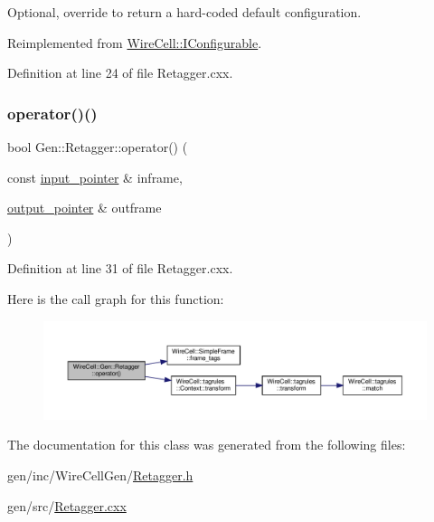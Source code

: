 Optional, override to return a hard-\/coded default configuration. 



Reimplemented from \hyperlink{class_wire_cell_1_1_i_configurable_a54841b2da3d1ea02189478bff96f7998}{Wire\+Cell\+::\+I\+Configurable}.



Definition at line 24 of file Retagger.\+cxx.

\mbox{\label{class_wire_cell_1_1_gen_1_1_retagger_a4bbeda9e4329bfa262e8248f5a876267}} 
\subsubsection{\texorpdfstring{operator()()}{operator()()}}
{\footnotesize\ttfamily bool Gen\+::\+Retagger\+::operator() (\begin{DoxyParamCaption}\item[{const \hyperlink{class_wire_cell_1_1_i_function_node_a55c0946156df9b712b8ad1a0b59b2db6}{input\+\_\+pointer} \&}]{inframe,  }\item[{\hyperlink{class_wire_cell_1_1_i_function_node_afc02f1ec60d31aacddf64963f9ca650b}{output\+\_\+pointer} \&}]{outframe }\end{DoxyParamCaption})\hspace{0.3cm}{\ttfamily [virtual]}}



Definition at line 31 of file Retagger.\+cxx.

Here is the call graph for this function\+:
\nopagebreak
\begin{figure}[H]
\begin{center}
\leavevmode
\includegraphics[width=350pt]{class_wire_cell_1_1_gen_1_1_retagger_a4bbeda9e4329bfa262e8248f5a876267_cgraph}
\end{center}
\end{figure}


The documentation for this class was generated from the following files\+:\begin{DoxyCompactItemize}
\item 
gen/inc/\+Wire\+Cell\+Gen/\hyperlink{_retagger_8h}{Retagger.\+h}\item 
gen/src/\hyperlink{_retagger_8cxx}{Retagger.\+cxx}\end{DoxyCompactItemize}
